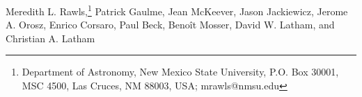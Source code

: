 

Meredith L. Rawls,\footnote{Department of Astronomy, New Mexico State University, P.O. Box 30001, MSC 4500, Las Cruces, NM 88003, USA; mrawls@nmsu.edu}
Patrick Gaulme, %
Jean McKeever, %
Jason Jackiewicz, %
Jerome A. Orosz, %
Enrico Corsaro, %
Paul Beck, %
Beno\^it Mosser, %
David W. Latham, %
and  
Christian A. Latham%

